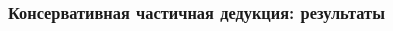 \documentclass{beamer}
\begin{document}
\begin{frame}[fragile]
  \frametitle{Консервативная частичная дедукция: результаты}
  \vspace{-1cm}
  \begin{columns}
    \begin{column}[]{0.4\textwidth}
      \begin{center}
      \end{center}
    \end{column}
    \begin{column}[]{0.6\textwidth}
      \begin{center}

\end{center}
\end{column}
\end{columns}
\end{frame}
\end{document}
